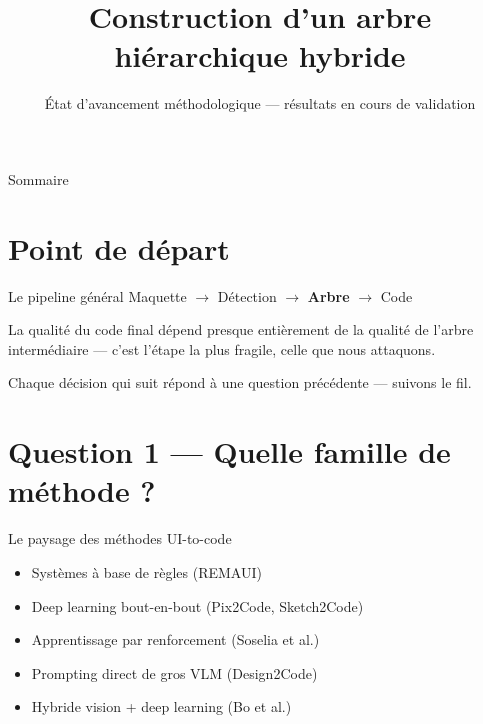\documentclass[11pt]{beamer}
\title{Construction d'un arbre hiérarchique hybride}
\subtitle{État d'avancement méthodologique --- résultats en cours de validation}
\date{}
\author{}
\begin{document}
\maketitle

\begin{frame}{Sommaire}
  \tableofcontents
\end{frame}

\section{Point de départ}

\begin{frame}{Le pipeline général}
  Maquette $\rightarrow$ Détection $\rightarrow$ \textbf{Arbre} $\rightarrow$ Code

  \vspace{1em}
  La qualité du code final dépend presque entièrement de la qualité de l'arbre
  intermédiaire --- c'est l'étape la plus fragile, celle que nous attaquons.

  \vspace{1em}
  \alert{Chaque décision qui suit répond à une question précédente --- suivons le
  fil.}
\end{frame}

\section{Question 1 --- Quelle famille de méthode ?}

\begin{frame}{Le paysage des méthodes UI-to-code}
  \small
  \begin{itemize}
    \item Systèmes à base de règles (REMAUI)
    \item Deep learning bout-en-bout (Pix2Code, Sketch2Code)
    \item Apprentissage par renforcement (Soselia et al.)
    \item Prompting direct de gros VLM (Design2Code)
    \item Hybride vision + deep learning (Bo et al.)
  \end{itemize}

  \vspace{0.5em}
\end{frame}
\end{document}
